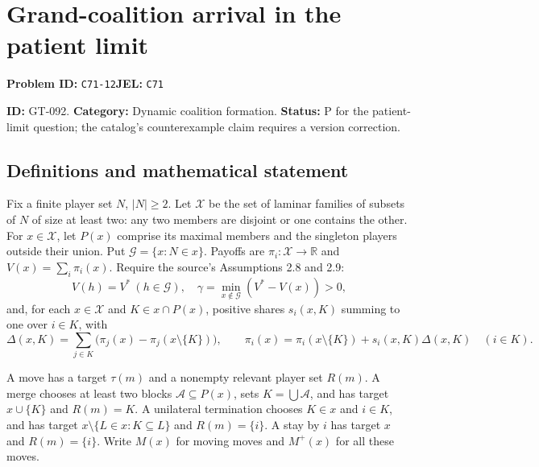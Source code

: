 \documentclass[11pt,a4paper]{article}
\begin{document}
\section*{Grand-coalition arrival in the patient limit}
\textbf{Problem ID:} \texttt{C71-12}\quad \textbf{JEL:} \texttt{C71}\par
\label{problem:OP-0222}
\label{game:GT-092}
{\sffamily\small\color{muted}
\noindent\textbf{ID:} GT-092. \textbf{Category:} Dynamic coalition formation.
\textbf{Status:} P for the patient-limit question; the catalog's counterexample claim requires a version correction.
\par}
\subsection*{Definitions and mathematical statement}
Fix a finite player set $N$, $|N|\geq2$. Let $\mathcal X$ be the set of laminar families of subsets of $N$ of size at least two: any two members are disjoint or one contains the other. For $x\in\mathcal X$, let $P(x)$ comprise its maximal members and the singleton players outside their union. Put
$\mathcal G=\{x:N\in x\}$. Payoffs are $\pi_i:\mathcal X\to\mathbb R$ and $V(x)=\sum_i\pi_i(x)$.
Require the source's Assumptions 2.8 and 2.9:
\[
 V(h)=V^*\ (h\in\mathcal G),\quad
 \gamma=\min_{x\notin\mathcal G}(V^*-V(x))>0,
\]
and, for each $x\in\mathcal X$ and $K\in x\cap P(x)$, positive shares $s_i(x,K)$ summing to one over $i\in K$, with
\[
 \Delta(x,K)=\sum_{j\in K}\bigl(\pi_j(x)-\pi_j(x\setminus\{K\})\bigr),\qquad
 \pi_i(x)=\pi_i(x\setminus\{K\})+s_i(x,K)\Delta(x,K)
 \quad(i\in K).
\]

A move has a target $\tau(m)$ and a nonempty relevant player set $R(m)$. A merge chooses at least two blocks $\mathcal A\subseteq P(x)$, sets $K=\bigcup\mathcal A$, and has target $x\cup\{K\}$ and $R(m)=K$. A unilateral termination chooses $K\in x$ and $i\in K$, and has target
$x\setminus\{L\in x:K\subseteq L\}$ and $R(m)=\{i\}$. A stay by $i$ has target $x$ and $R(m)=\{i\}$. Write $M(x)$ for moving moves and $M^+(x)$ for all these moves.
\end{document}
